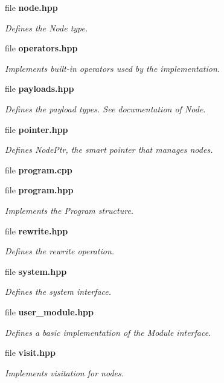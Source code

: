 \begin{CompactItemize}
\item 
file {\bf node.hpp}
\begin{CompactList}\small\item\em Defines the Node type. \item\end{CompactList}

\item 
file {\bf operators.hpp}
\begin{CompactList}\small\item\em Implements built-in operators used by the implementation. \item\end{CompactList}

\item 
file {\bf payloads.hpp}
\begin{CompactList}\small\item\em Defines the payload types. See documentation of Node. \item\end{CompactList}

\item 
file {\bf pointer.hpp}
\begin{CompactList}\small\item\em Defines Node\-Ptr, the smart pointer that manages nodes. \item\end{CompactList}

\item 
file {\bf program.cpp}
\item 
file {\bf program.hpp}
\begin{CompactList}\small\item\em Implements the Program structure. \item\end{CompactList}

\item 
file {\bf rewrite.hpp}
\begin{CompactList}\small\item\em Defines the rewrite operation. \item\end{CompactList}

\item 
file {\bf system.hpp}
\begin{CompactList}\small\item\em Defines the system interface. \item\end{CompactList}

\item 
file {\bf user\_\-module.hpp}
\begin{CompactList}\small\item\em Defines a basic implementation of the Module interface. \item\end{CompactList}

\item 
file {\bf visit.hpp}
\begin{CompactList}\small\item\em Implements visitation for nodes. \item\end{CompactList}

\end{CompactItemize}
